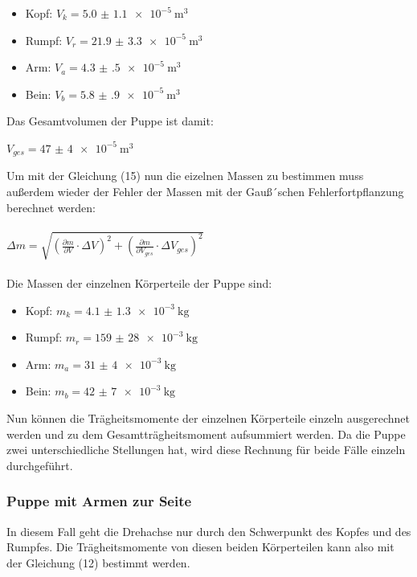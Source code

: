 \begin{itemize}
  \item Kopf: $V_k = \SI{5.0(11)e-5}{\meter\tothe{3}}$
  \item Rumpf: $V_r = \SI{21.9(33)e-5}{\meter\tothe{3}}$
  \item Arm: $V_a = \SI{4.3(5)e-5}{\meter\tothe{3}}$
  \item Bein: $V_b = \SI{5.8(9)e-5}{\meter\tothe{3}}$
\end{itemize}

Das Gesamtvolumen der Puppe ist damit:

\centerline{$V_{ges} = \SI{47(4)e-5}{\meter\tothe{3}}$}

Um mit der Gleichung (15) nun die eizelnen Massen zu bestimmen muss außerdem wieder
der Fehler der Massen mit der Gauß´schen Fehlerfortpflanzung berechnet werden:\\\\

$\Delta m = \sqrt{\left(\frac{\partial m}{\partial V} \cdot \Delta V \right)^2
  + \left(\frac{\partial m}{\partial V_{ges}} \cdot \Delta V_{ges} \right)^2}$\\\\

Die Massen der einzelnen Körperteile der Puppe sind:

\begin{itemize}
  \item Kopf: $m_k = \SI{4.1(13)e-3}{\kilo\gram}$
  \item Rumpf: $m_r = \SI{159(28)e-3}{\kilo\gram}$
  \item Arm: $m_a = \SI{31(4)e-3}{\kilo\gram}$
  \item Bein: $m_b = \SI{42(7)e-3}{\kilo\gram}$
\end{itemize}

Nun können die Trägheitsmomente der einzelnen Körperteile einzeln ausgerechnet werden
und zu dem Gesamtträgheitsmoment aufsummiert werden. Da die Puppe zwei unterschiedliche
Stellungen hat, wird diese Rechnung für beide Fälle einzeln durchgeführt.

\subsubsection{Puppe mit Armen zur Seite}

In diesem Fall geht die Drehachse nur durch den Schwerpunkt des Kopfes und des Rumpfes.
Die Trägheitsmomente von diesen beiden Körperteilen kann also mit der Gleichung (12)
bestimmt werden.

